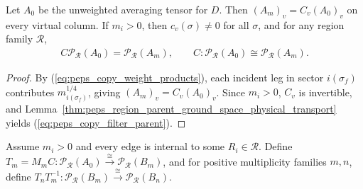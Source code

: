 \begin{lemma}%
    \label{thm:peps_copy_physical_filter}
    \leanok
    Let $A_0$ be the unweighted averaging tensor for $D$. Then $(A_m)_v=C_v(A_0)_v$ on every virtual column. If $m_i>0$, then $c_v(\sigma)\ne 0$ for all $\sigma$, and for any region family $\mathcal R$,
    \begin{align}
        C\mathcal P_{\mathcal R}(A_0)=\mathcal P_{\mathcal R}(A_m),
        \qquad
        C:\mathcal P_{\mathcal R}(A_0)\cong\mathcal P_{\mathcal R}(A_m).
        \label{eq:peps_copy_filter_parent}
    \end{align}
\end{lemma}
\begin{proof}\leanok
    By (\ref{eq:peps_copy_weight_products}), each incident leg in sector $i(\sigma_f)$ contributes $m_{i(\sigma_f)}^{1/4}$, giving $(A_m)_v=C_v(A_0)_v$. Since $m_i>0$, $C_v$ is invertible, and Lemma~\ref{thm:peps_region_parent_ground_space_physical_transport} yields (\ref{eq:peps_copy_filter_parent}).
\end{proof}

\begin{definition}%
    \label{def:peps_copy_positive_parent_map}
    \leanok
    Assume $m_i>0$ and every edge is internal to some $R_i\in\mathcal R$. Define $T_m=M_mC:\mathcal P_{\mathcal R}(A_0)\xrightarrow{\cong}\mathcal P_{\mathcal R}(B_m)$, and for positive multiplicity families $m,n$, define $T_nT_m^{-1}:\mathcal P_{\mathcal R}(B_m)\xrightarrow{\cong}\mathcal P_{\mathcal R}(B_n)$.
\end{definition}

